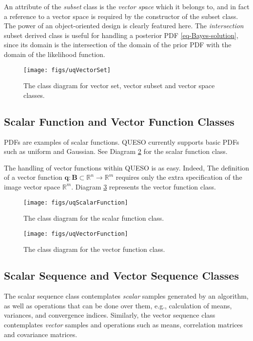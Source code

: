 An attribute of the {\it subset} class is the {\it vector space} which it belongs to, and in fact a reference to a vector space is required by the constructor of the subset class.
The power of an object-oriented design is clearly featured here.
The {\it intersection} subset derived class is useful for handling a posterior PDF \eqref{eq-Bayes-solution},
since its domain is the intersection of the domain of the prior PDF with the domain of the likelihood function.

\begin{figure}[hp]
\centering
\texttt{[image: figs/uqVectorSet]}
\vspace*{-8pt}
\caption{The class diagram for vector set, vector subset and vector space classes.}
\label{fig-vector-space-subset-classes}
\end{figure}

\subsection{Scalar Function and Vector Function Classes}\label{sec:scalar-vector-function}


PDFs are examples of scalar functions.
QUESO currently supports basic PDFs such as uniform and Gaussian.
See Diagram \ref{fig-scalar-function-class} for the scalar function class.

The handling of vector functions within QUESO is as easy. Indeed,
The definition of a vector function $\mathbf{q}:\mathbf{B}\subset\mathbb{R}^n\rightarrow\mathbb{R}^m$ requires only the extra specification of the image vector space $\mathbb{R}^m$. Diagram \ref{fig-vector-function-class} represents the vector function class.
\begin{figure}[h!]
\centering
\texttt{[image: figs/uqScalarFunction]}
\vspace{-8pt}
\caption{The class diagram for the scalar function class.}
\label{fig-scalar-function-class}
\end{figure}

\begin{figure}[h!]
\centering
\texttt{[image: figs/uqVectorFunction]}
\vspace{-8pt}
\caption{The class diagram for the vector function class.}
\label{fig-vector-function-class}
\end{figure}


\subsection{Scalar Sequence and Vector Sequence Classes}\label{sec:scalar-vector-sequence}
%
The scalar sequence class contemplates {\it scalar} samples generated by an algorithm, as well as operations that can
be done over them, e.g., calculation of means, variances, and convergence indices.
Similarly, the vector sequence class contemplates {\it vector} samples and operations such as means, correlation matrices and covariance matrices.

